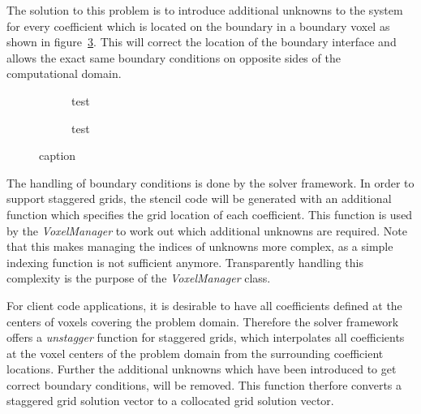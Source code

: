 The solution to this problem is to introduce additional unknowns to the system for every coefficient which is located on the boundary in a boundary voxel as shown in figure~\ref{fig:pn_staggered_grid_handled_bc}. This will correct the location of the boundary interface and allows the exact same boundary conditions on opposite sides of the computational domain.
\begin{figure}[h]
\centering
\begin{subfigure}{0.49\columnwidth}
\caption{test}
\label{fig:pn_staggering_correct_bc}
\end{subfigure}%
\hspace{0.01\columnwidth}
\begin{subfigure}{0.49\columnwidth}
\caption{test}
\label{fig:pn_staggering_correct_bc_checkerboard}
\end{subfigure}%
\caption{caption}
\label{fig:pn_staggered_grid_handled_bc}
\end{figure}

The handling of boundary conditions is done by the solver framework. In order to support staggered grids, the stencil code will be generated with an additional function which specifies the grid location of each coefficient. This function is used by the \emph{VoxelManager} to work out which additional unknowns are required. Note that this makes managing the indices of unknowns more complex, as a simple indexing function is not sufficient anymore. Transparently handling this complexity is the purpose of the \emph{VoxelManager} class.

For client code applications, it is desirable to have all coefficients defined at the centers of voxels covering the problem domain. Therefore the solver framework offers a \emph{unstagger} function for staggered grids, which interpolates all coefficients at the voxel centers of the problem domain from the surrounding coefficient locations. Further the additional unknowns which have been introduced to get correct boundary conditions, will be removed. This function therfore converts a staggered grid solution vector to a collocated grid solution vector.


